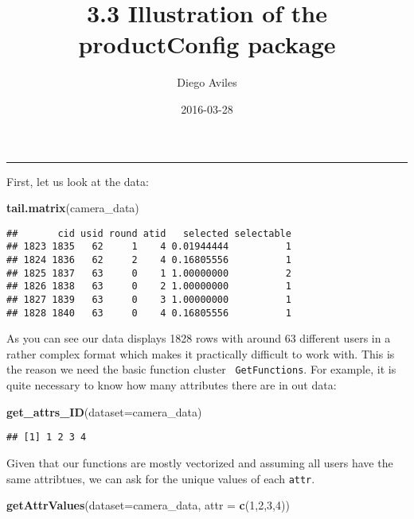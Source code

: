 \documentclass[]{article}
\title{3.3 Illustration of the productConfig package}
\author{Diego Aviles}
\date{2016-03-28}
\newenvironment{Shaded}{\begin{snugshade}}{\end{snugshade}}
\newcommand{\KeywordTok}[1]{\textcolor[rgb]{0.13,0.29,0.53}{\textbf{{#1}}}}
\newcommand{\DataTypeTok}[1]{\textcolor[rgb]{0.13,0.29,0.53}{{#1}}}
\newcommand{\DecValTok}[1]{\textcolor[rgb]{0.00,0.00,0.81}{{#1}}}
\newcommand{\NormalTok}[1]{{#1}}
\begin{document}
\maketitle


\begin{center}\rule{0.5\linewidth}{\linethickness}\end{center}

First, let us look at the data:

\begin{Shaded}
\begin{Highlighting}[]
\KeywordTok{tail.matrix}\NormalTok{(camera_data)}
\end{Highlighting}
\end{Shaded}

\begin{verbatim}
##       cid usid round atid   selected selectable
## 1823 1835   62     1    4 0.01944444          1
## 1824 1836   62     2    4 0.16805556          1
## 1825 1837   63     0    1 1.00000000          2
## 1826 1838   63     0    2 1.00000000          1
## 1827 1839   63     0    3 1.00000000          1
## 1828 1840   63     0    4 0.16805556          1
\end{verbatim}

As you can see our data displays 1828 rows with around 63 different
users in a rather complex format which makes it practically difficult to
work with. This is the reason we need the basic function cluster
\texttt{ GetFunctions}. For example, it is quite necessary to know how
many attributes there are in out data:

\begin{Shaded}
\begin{Highlighting}[]
\KeywordTok{get_attrs_ID}\NormalTok{(}\DataTypeTok{dataset=}\NormalTok{camera_data)}
\end{Highlighting}
\end{Shaded}

\begin{verbatim}
## [1] 1 2 3 4
\end{verbatim}

Given that our functions are mostly vectorized and assuming all users
have the same attribtues, we can ask for the unique values of each
\texttt{attr}.

\begin{Shaded}
\begin{Highlighting}[]
\KeywordTok{getAttrValues}\NormalTok{(}\DataTypeTok{dataset=}\NormalTok{camera_data, }\DataTypeTok{attr =} \KeywordTok{c}\NormalTok{(}\DecValTok{1}\NormalTok{,}\DecValTok{2}\NormalTok{,}\DecValTok{3}\NormalTok{,}\DecValTok{4}\NormalTok{))}
\end{Highlighting}
\end{Shaded}
\end{document}
